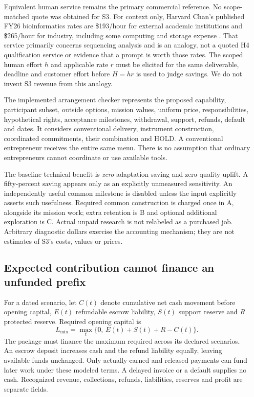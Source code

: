 Equivalent human service remains the primary commercial reference. No scope-matched quote was obtained for S3. For context only, Harvard Chan's published FY26 bioinformatics rates are \$193/hour for external academic institutions and \$265/hour for industry, including some computing and storage expense \cite{hbc}. That service primarily concerns sequencing analysis and is an analogy, not a quoted H4 qualification service or evidence that a prompt is worth those rates. The scoped human effort $h$ and applicable rate $r$ must be elicited for the same deliverable, deadline and customer effort before $H=hr$ is used to judge savings. We do not invent S3 revenue from this analogy.

The implemented arrangement checker represents the proposed capability, participant subset, outside options, mission values, uniform price, responsibilities, hypothetical rights, acceptance milestones, withdrawal, support, refunds, default and dates. It considers conventional delivery, instrument construction, coordinated commitments, their combination and HOLD. A conventional entrepreneur receives the entire same menu. There is no assumption that ordinary entrepreneurs cannot coordinate or use available tools.

The baseline technical benefit is \emph{zero} adaptation saving and zero quality uplift. A fifty-percent saving appears only as an explicitly unmeasured sensitivity. An independently useful common milestone is disabled unless the input explicitly asserts such usefulness. Required common construction is charged once in A, alongside its mission work; extra retention is B and optional additional exploration is C. Actual unpaid research is not relabeled as a purchased job. Arbitrary diagnostic dollars exercise the accounting mechanism; they are not estimates of S3's costs, values or prices.

\subsection{Expected contribution cannot finance an unfunded prefix}
For a dated scenario, let $C(t)$ denote cumulative net cash movement before opening capital, $E(t)$ refundable escrow liability, $S(t)$ support reserve and $R$ protected reserve. Required opening capital is
\[
L_{\min}=\max_t\{0,\ E(t)+S(t)+R-C(t)\}.
\]
The package must finance the maximum required across its declared scenarios. An escrow deposit increases cash and the refund liability equally, leaving available funds unchanged. Only actually earned and released payments can fund later work under these modeled terms. A delayed invoice or a default supplies no cash. Recognized revenue, collections, refunds, liabilities, reserves and profit are separate fields.

